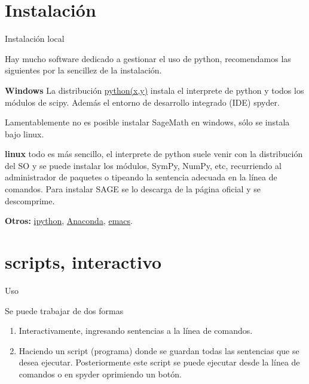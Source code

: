 \documentclass[handout,hyperref={colorlinks=true}]{beamer}
\begin{document}
\section{Instalación} 
\begin{frame}{Instalación local}

Hay mucho software dedicado a gestionar el uso de python, recomendamos las siguientes por la sencillez de la instalación.  

\textbf{Windows} La distribución  \href{https://code.google.com/p/pythonxy/}{python(x,y)}  instala el interprete de python y todos los módulos de scipy. Además el entorno de desarrollo integrado (IDE) spyder. 

Lamentablemente no es posible instalar SageMath en windows, sólo se instala bajo linux.

\textbf{linux} todo es más sencillo, el interprete de python suele venir con la distribución del SO y se puede instalar los módulos, SymPy, NumPy, etc, recurriendo al administrador de paquetes o tipeando la sentencia adecuada en la línea de comandos.  Para instalar SAGE se lo descarga de la página oficial y se descomprime.

\textbf{Otros:} \href{http://ipython.org}{ipython}, \href{http://continuum.io/downloads}{Anaconda}, \href{http://www.gnu.org/software/emacs/}{emacs}.
\end{frame}

\section{scripts, interactivo}
\begin{frame}{Uso}

\onslide<+->Se puede trabajar de dos formas

\begin{enumerate}
\item<+-> Interactivamente, ingresando sentencias a la línea de comandos.

\item<+-> Haciendo un script (programa) donde se guardan todas las sentencias que se desea ejecutar. Posteriormente este script se puede ejecutar desde la línea de comandos o en spyder oprimiendo un botón.

\end{enumerate}



\end{frame}
\end{document}
